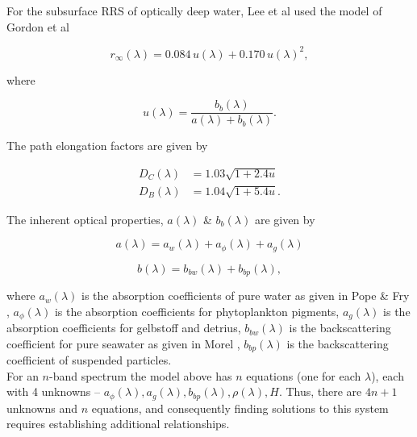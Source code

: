 \documentclass[12pt]{article}
\numberwithin{equation}{section}
\begin{document}
For the subsurface RRS of optically deep water, Lee et al \cite{lee1998}\cite{lee1999}\cite{lee2001} 
used the model of Gordon et al \cite{gordon1988} 
\begin{linenomath}
\begin{equation*}
r_{\infty}(\lambda) = 0.084\,u(\lambda) + 0.170\,u(\lambda)^2,
\end{equation*} 
\end{linenomath}
where 
\begin{linenomath}
\begin{equation*}
u(\lambda) = \frac{b_b(\lambda)}{a(\lambda) + b_b(\lambda)}.
\end{equation*} 
\end{linenomath}

The path elongation factors are given by 
\begin{linenomath}
\begin{align*}
D_C(\lambda) &= 1.03 \sqrt{1 + 2.4 u}\\
D_B(\lambda) &= 1.04 \sqrt{1 + 5.4 u}.
\end{align*}
\end{linenomath}

The inherent optical properties, $a(\lambda)$ \& $b_b(\lambda)$ are given by 
\begin{linenomath}
\begin{equation*}
a(\lambda) = a_w(\lambda) + a_{\phi}(\lambda) + a_g(\lambda)
\end{equation*} 
\end{linenomath}
\begin{linenomath}
\begin{equation*}
b(\lambda) = b_{bw}(\lambda) + b_{bp}(\lambda),
\end{equation*} 
\end{linenomath}
where $a_w(\lambda)$ is the absorption coefficients of pure water as given in Pope \& 
Fry \cite{pope1997}, $a_{\phi}(\lambda)$ is the absorption coefficients for phytoplankton 
pigments, $a_g(\lambda)$ is the absorption coefficients for gelbstoff and detrius, 
$b_{bw}(\lambda)$ is the backscattering coefficient for pure seawater as given in 
Morel \cite{morel1974}, $b_{bp}(\lambda)$ is the backscattering coefficient of 
suspended particles. \\

For an $n$-band spectrum the model above has $n$ equations (one for each $\lambda$), each 
with 4 unknowns -- $a_{\phi}(\lambda), a_g(\lambda), b_{bp}(\lambda), \rho(\lambda), H$. 
Thus, there are $4n + 1$ unknowns and $n$ equations, and consequently finding solutions 
to this system requires establishing additional relationships. \\
\end{document}
